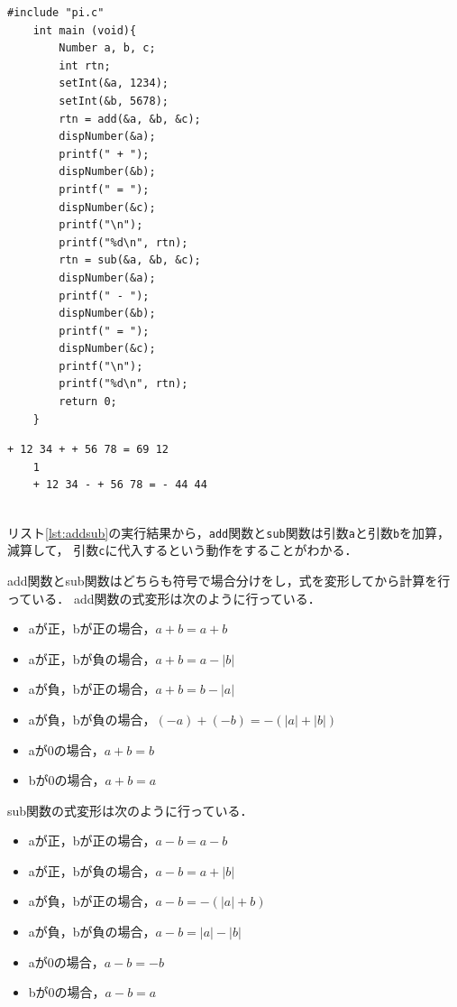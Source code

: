 \documentclass[a4paper,11pt,dvipdfmx]{jsarticle}
\begin{document}
\begin{lstlisting}[caption=\texttt{add}関数と\texttt{sub}関数の呼び出し,label=doAddSub]
    #include "pi.c"
    int main (void){
        Number a, b, c;
        int rtn;
        setInt(&a, 1234);
        setInt(&b, 5678);
        rtn = add(&a, &b, &c);
        dispNumber(&a);
        printf(" + ");
        dispNumber(&b);
        printf(" = ");
        dispNumber(&c);
        printf("\n");
        printf("%d\n", rtn);
        rtn = sub(&a, &b, &c);
        dispNumber(&a);
        printf(" - ");
        dispNumber(&b);
        printf(" = ");
        dispNumber(&c);
        printf("\n");
        printf("%d\n", rtn);
        return 0;
    }
\end{lstlisting}
\begin{lstlisting}[caption=リスト\ref{doAddSub}の実行結果,label=lst:addsub]
    + 12 34 + + 56 78 = 69 12
    1
    + 12 34 - + 56 78 = - 44 44
    
\end{lstlisting}

リスト\ref{lst:addsub}の実行結果から，\texttt{add}関数と\texttt{sub}関数は引数\texttt{a}と引数\texttt{b}を加算，減算して，
引数\texttt{c}に代入するという動作をすることがわかる．

add関数とsub関数はどちらも符号で場合分けをし，式を変形してから計算を行っている．
add関数の式変形は次のように行っている．
\begin{itemize}
    \item aが正，bが正の場合，$a + b = a + b$
    \item aが正，bが負の場合，$a + b = a - |b|$
    \item aが負，bが正の場合，$a + b = b - |a|$
    \item aが負，bが負の場合，$(-a) + (-b) = -(|a| + |b|)$
    \item aが0の場合，$a + b = b$
    \item bが0の場合，$a + b = a$
\end{itemize}

sub関数の式変形は次のように行っている．
\begin{itemize}
    \item aが正，bが正の場合，$a - b = a - b$
    \item aが正，bが負の場合，$a - b = a + |b|$
    \item aが負，bが正の場合，$a - b = -(|a| + b)$
    \item aが負，bが負の場合，$a - b = |a| - |b|$
    \item aが0の場合，$a - b = -b$
    \item bが0の場合，$a - b = a$
\end{itemize}
\end{document}
